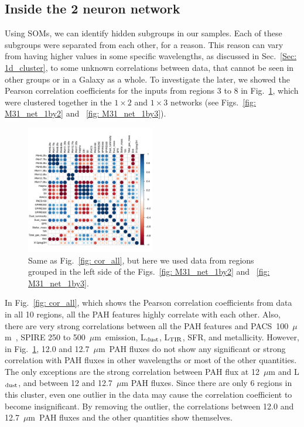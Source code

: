         
    \subsection{Inside the 2 neuron network}%
        \label{sec: inside_the_2_neurons}
        Using SOMs, we can identify hidden subgroups in our samples. 
        Each of these subgroups were separated from each other, for a reason.
        This reason can vary from having higher values in some specific wavelengths, as discussed in Sec.~\ref{Sec: 1d_cluster}, to some unknown correlations between data, that cannot be seen in other groups or in a Galaxy as a whole.
        To investigate the later, we showed the Pearson correlation coefficients for the inputs from regions 3 to 8 in Fig.~\ref{fig: cor_cluster1}, which were clustered together in the $1\times2$ and $1\times3$ networks (see Figs.~\ref{fig: M31_net_1by2} and ~\ref{fig: M31_net_1by3}).
        
        \begin{figure}
        \includegraphics[width=0.5\textwidth]{../images0.01/cor_plots/M31_derived_3_to_8_core_plot_for_paper.pdf}%
        \caption{Same as Fig.~\ref{fig: cor_all}, but here we used data from regions grouped in the left side of the Figs.~\ref{fig: M31_net_1by2} and ~\ref{fig: M31_net_1by3}. }
          \label{fig: cor_cluster1}
        \end{figure}
        
        In Fig.~\ref{fig: cor_all}, which shows the Pearson correlation coefficients from data in all 10 regions, all the PAH features highly correlate with each other. 
        Also, there are very strong correlations between all the PAH features and PACS~100~$\mu$m~, SPIRE 250 to 500~$\mu$m~emission, L$_{\rm dust}$, L$_{\rm TIR}$, SFR, and metallicity.
        However, in Fig.~\ref{fig: cor_cluster1}, 12.0 and 12.7~$\mu$m~PAH fluxes do not show any significant or strong correlation with PAH fluxes in other wavelengths or most of the other quantities.
        The only exceptions are the strong correlation between PAH flux at 12~$\mu$m and L$_{\rm dust}$, and between 12 and 12.7~$\mu$m PAH fluxes.
        Since there are only 6 regions in this cluster, even one outlier in the data may cause the correlation coefficient to become insignificant.
        By removing the outlier, the correlations between 12.0 and 12.7~$\mu$m~PAH fluxes and the other quantities show themselves. 
        
